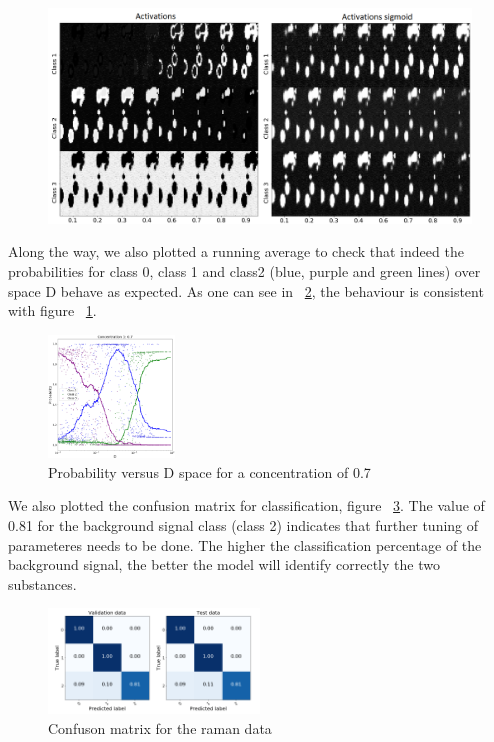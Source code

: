 \documentclass{article}
\begin{document}
\begin{figure}[!h]
  \includegraphics[width=1\linewidth]{figures_3/DNN_prop_sigmoid_im.png}
    \label{fig:activations}
\end{figure}
Along the way, we also plotted a running average to check that indeed the probabilities for class 0, class 1 and class2 (blue, purple and green lines) over space D behave as expected. As one can see in ~\ref{fig:Dspace}, the behaviour is consistent with figure ~\ref{fig:activations}.
\begin{figure}[!h]
	\centering
	\includegraphics[width=0.3\textwidth]{figures_3/DNN_D_vs_prob_6.png}
	\caption{Probability versus D space for a concentration of 0.7}
	\label{fig:Dspace}
\end{figure}

We also plotted the confusion matrix for classification, figure ~\ref{fig:confusion}. The value of 0.81 for the background signal class (class 2) indicates that further tuning of parameteres needs to be done. The higher the classification percentage of the background signal, the better the model will identify correctly the two substances.

\begin{figure}[!h]
  \centering
  \includegraphics[width=0.5\textwidth]{figures_2/raman_sim_3_conf_matrix13.png}
  \caption{Confuson matrix for the raman data}
  \label{fig:confusion}
\end{figure}
\end{document}

